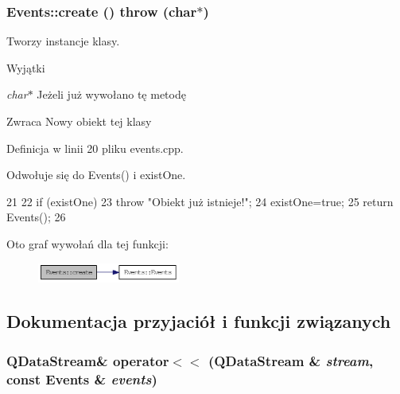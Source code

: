 \hypertarget{classEvents_ac4ccb0fd05c7bc876b95cf6cdd549666}{
\subsubsection[{create}]{ Events::create ()  throw (char$\ast$)}}
\label{classEvents_ac4ccb0fd05c7bc876b95cf6cdd549666}


Tworzy instancje klasy. 


\begin{DoxyExceptions}{Wyjątki}
\item[{\em char$\ast$}]Jeżeli już wywołano tę metodę \end{DoxyExceptions}
\begin{DoxyReturn}{Zwraca}
Nowy obiekt tej klasy 
\end{DoxyReturn}


Definicja w linii 20 pliku events.cpp.



Odwołuje się do Events() i existOne.




\begin{DoxyCode}
21 {
22     if (existOne)
23         throw "Obiekt już istnieje!";
24     existOne=true;
25     return Events();
26 }
\end{DoxyCode}




Oto graf wywołań dla tej funkcji:\nopagebreak
\begin{figure}[H]
\begin{center}
\leavevmode
\includegraphics[width=133pt]{classEvents_ac4ccb0fd05c7bc876b95cf6cdd549666_cgraph}
\end{center}
\end{figure}




\subsection{Dokumentacja przyjaciół i funkcji związanych}
\hypertarget{classEvents_a560f3fdc9b76a9fe9146335122ecda39}{
\subsubsection[{operator$<$$<$}]{\setlength{\rightskip}{0pt plus 5cm}QDataStream\& operator$<$$<$ (QDataStream \& {\em stream}, \/  const {\bf Events} \& {\em events})}}
\label{classEvents_a560f3fdc9b76a9fe9146335122ecda39}


